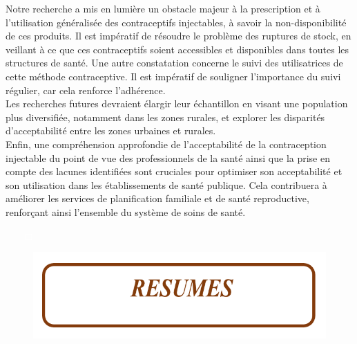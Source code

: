 \noindent Notre recherche a mis en lumière un obstacle majeur à la prescription et à l'utilisation généralisée des contraceptifs injectables, à savoir la non-disponibilité de ces produits. Il est impératif de résoudre le problème des ruptures de stock, en veillant à ce que ces contraceptifs soient accessibles et disponibles dans toutes les structures de santé. Une autre constatation concerne le suivi des utilisatrices de cette méthode contraceptive. Il est impératif de souligner l'importance du suivi régulier, car cela renforce l'adhérence.\\

\noindent Les recherches futures devraient élargir leur échantillon en visant une population plus diversifiée, notamment dans les zones rurales, et explorer les disparités d'acceptabilité entre les zones urbaines et rurales.\\

\noindent Enfin, une compréhension approfondie de l'acceptabilité de la contraception injectable du point de vue des professionnels de la santé ainsi que la prise en compte des lacunes identifiées sont cruciales pour optimiser son acceptabilité et son utilisation dans les établissements de santé publique. Cela contribuera à améliorer les services de planification familiale et de santé reproductive, renforçant ainsi l'ensemble du système de soins de santé.







\pagebreak


\begin{itemize}
  \item[\textcolor{white}{$\Box$}] 
\end{itemize}


\vspace{7cm}

\begin{figure}[H]
  \includegraphics{Images/resumes.png}
\end{figure}

